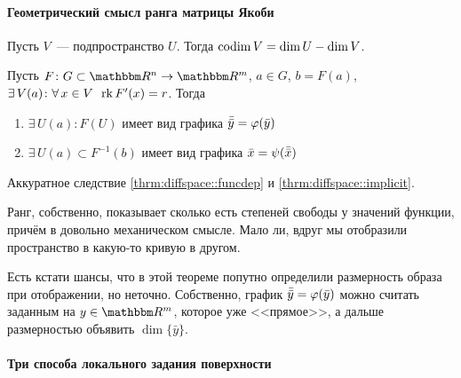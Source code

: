 \documentclass[12pt,timbord]{../../../notes}
\begin{document}
\newcommand\bbar[1]{\ensuremath\bar{\bar{#1}}}

\paragraph{Геометрический смысл ранга матрицы Якоби}
\label{par:diffspace::geomjacob}
\begin{defn}[Коразмерность]\label{defn:diffspace::geomjacob::codim}
  Пусть $V$~--- подпространство $U$. Тогда $\operatorname{codim} V = \dim U - \dim V$.
\end{defn}
\begin{thrm}\label{thrm:diffspace::geomjacob}
  Пусть $F \colon G \subset \R^n \to \R^m$, $a\in G$, $b = F(a)$,
  $\exists\, V(a) \colon \forall\, x\in V \;\:\operatorname{rk} F'(x) = r$.
  Тогда 
  \begin{enumerate}
    \item $\exists\, U(a)\colon F(U)$ имеет вид графика $\bbar y = \varphi(\bar y)$
    \item $\exists\, U(a)\subset F^{-1}(b)$ имеет вид графика $\bar x = \psi(\bbar x)$
  \end{enumerate}
\end{thrm}
\begin{ittproof}
  Аккуратное следствие \ref{thrm:diffspace::funcdep} и \ref{thrm:diffspace::implicit}.
\end{ittproof}
\begin{rem*}
  Ранг, собственно, показывает сколько есть степеней свободы у значений функции, причём в
  довольно механическом смысле.
  Мало ли, вдруг мы отобразили пространство в какую-то кривую в другом.
  
  Есть кстати шансы, что в этой теореме попутно определили размерность образа при отображении, но
  неточно. Собственно, график $\bbar y =  \varphi(\bar y)$ можно считать заданным на $y\in \R^m$,
  которое уже <<прямое>>, а дальше размерностью объявить $\dim \{\bar y\}$.
\end{rem*}

\paragraph{Три способа локального задания поверхности}
\label{par:diffspace::locsurfeqs}
\end{document}
